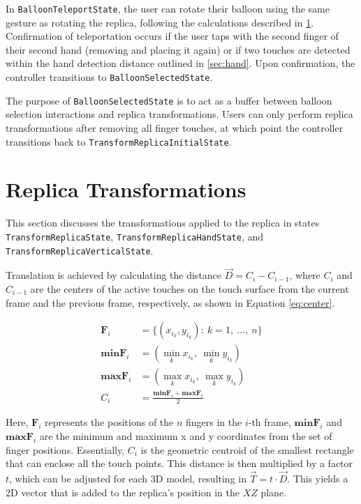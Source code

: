     In \lstinline{BalloonTeleportState}, the user can rotate their balloon using the same gesture as rotating the replica, following the calculations described in \ref{sec:transformation}. Confirmation of teleportation occurs if the user taps with the second finger of their second hand (removing and placing it again) or if two touches are detected within the hand detection distance outlined in \ref{sec:hand}. Upon confirmation, the controller transitions to \lstinline{BalloonSelectedState}.
    
    The purpose of \lstinline{BalloonSelectedState} is to act as a buffer between balloon selection interactions and replica transformations. Users can only perform replica transformations after removing all finger touches, at which point the controller transitions back to \lstinline{TransformReplicaInitialState}.


\section{Replica Transformations} \label{sec:transformation}

    This section discusses the transformations applied to the replica in states \lstinline{TransformReplicaState}, \lstinline{TransformReplicaHandState}, and \lstinline{TransformReplicaVerticalState}.
    
    Translation is achieved by calculating the distance \(\vec{D} = C_{i} - C_{i-1}\), where \(C_{i}\) and \(C_{i-1}\) are the centers of the active touches on the touch surface from the current frame and the previous frame, respectively, as shown in Equation \ref{eq:center}.

    \begin{figure}[h]
    \begin{equation}
    \begin{split} \label{eq:center}
        \mathbf{F}_i &= \{(x_{i_k}, y_{i_k}) :\ k = 1,\ \dots,\ n\} \\
        \mathbf{minF}_i &= (\min_{k} x_{i_k},\ \min_{k} y_{i_k}) \\
        \mathbf{maxF}_i &= (\max_{k} x_{i_k},\ \max_{k} y_{i_k}) \\
        C_i &= \frac{\mathbf{minF}_i + \mathbf{maxF}_i}{2}
    \end{split}
    \end{equation}
    \end{figure}

    Here, \(\mathbf{F}_i\) represents the positions of the \(n\) fingers in the \(i\)-th frame, \(\mathbf{minF}_i\) and \(\mathbf{maxF}_i\) are the minimum and maximum x and y coordinates from the set of finger positions. Essentially, \(C_i\) is the geometric centroid of the smallest rectangle that can enclose all the touch points. This distance is then multiplied by a factor \(t\), which can be adjusted for each 3D model, resulting in \(\vec{T} = t \cdot \vec{D}\). This yields a 2D vector that is added to the replica's position in the \(XZ\) plane.

